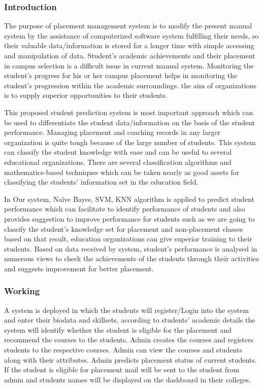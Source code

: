 \documentclass[12pt]{article}
\begin{document}
\subsubsection{Introduction}
The purpose of placement management system is to modify the present 
manual system by the assistance of computerized software 
system fulfilling their needs, so their valuable 
data/information is stored for a longer time with simple 
accessing and manipulation of data. Student’s academic 
achievements and their placement in campus selection is a 
difficult issue in current manual system. Monitoring the 
student’s progress for his or her campus placement helps in 
monitoring the student’s progression within the academic 
surroundings. the aim of organizations is to supply superior 
opportunities to their students. 

This proposed student prediction system is most important approach which can be 
used to differentiate the student data/information on the basis 
of the student performance. Managing placement and 
coaching records in any larger organization is quite tough 
because of the large number of students. This system can 
classify the student knowledge with ease and can be useful to 
several educational organizations. There are several 
classification algorithms and mathematics-based techniques 
which can be taken nearly as good assets for classifying the 
students’ information set in the education field. 

In Our system, Naïve Bayes, SVM, KNN algorithm is applied to predict 
student performance which can facilitate to identify 
performance of students and also provides suggestion to 
improve performance for students such as we are going to 
classify the student's knowledge set for placement and non-placement classes based on that result, education 
organizations can give superior training to their students. 
Based on data received by system, student’s performance is 
analysed in numerous views to check the achievements of the 
students through their activities and suggests improvement for 
better placement.

\newpage
\subsubsection{Working}

A system is deployed in which the 
students will register/Login into the system and enter their 
biodata and skillsets, according to students’ academic details 
the system will identify whether the student is eligible for the 
placement and recommend the courses to the students. Admin 
creates the courses and registers students to the respective 
courses. Admin can view the courses and students along with 
their attributes. Admin predicts placement status of current 
students. If the student is eligible for placement mail will be 
sent to the student from admin and students names will be 
displayed on the dashboard in their colleges.
\end{document}
